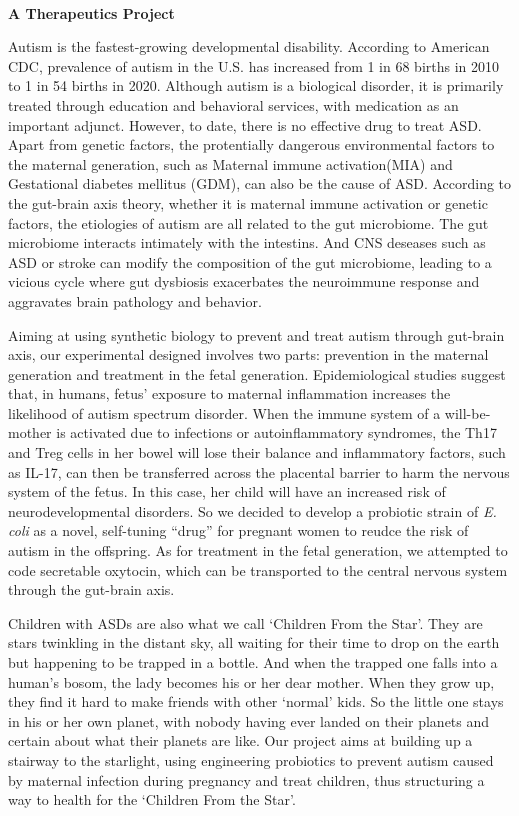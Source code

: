 \textbf{\\A Therapeutics Project\\}\begin{spacing}{1.5}

Autism is the fastest-growing developmental disability. According to American CDC, prevalence of autism in the U.S. has increased from 1 in 68 births in 2010 to 1 in 54 births in 2020. Although autism is a biological disorder, it is primarily treated through education and behavioral services, with medication as an important adjunct. However, to date, there is no effective drug to treat ASD. Apart from genetic factors, the protentially dangerous environmental factors to the maternal generation, such as Maternal immune activation(MIA) and Gestational diabetes mellitus (GDM), can also be the cause of ASD. According to the gut-brain axis theory, whether it is maternal immune activation or genetic factors, the etiologies of autism are all related to the gut microbiome. The gut microbiome interacts intimately with the intestins. And CNS deseases such as ASD or stroke can modify the composition of the gut microbiome, leading to a vicious cycle where gut dysbiosis exacerbates the neuroimmune response and aggravates brain pathology and behavior.

Aiming at using synthetic biology to prevent and treat autism through gut-brain axis, our experimental designed involves two parts: prevention in the maternal generation and treatment in the fetal generation. Epidemiological studies suggest that, in humans, fetus’ exposure to maternal inflammation increases the likelihood of autism spectrum disorder. When the immune system of a will-be-mother is activated due to infections or autoinflammatory syndromes, the Th17 and Treg cells in her bowel will lose their balance and inflammatory factors, such as IL-17, can then be transferred across the placental barrier to harm the nervous system of the fetus. In this case, her child will have an increased risk of neurodevelopmental disorders. So we decided to develop a probiotic strain of \textit{E. coli} as a novel, self-tuning “drug” for pregnant women to reudce the risk of autism in the offspring. As for treatment in the fetal generation, we attempted to code secretable oxytocin, which can be transported to the central nervous system through the gut-brain axis.

Children with ASDs are also what we call ‘Children From the Star’. They are stars twinkling in the distant sky, all waiting for their time to drop on the earth but happening to be trapped in a bottle. And when the trapped one falls into a human’s bosom, the lady becomes his or her dear mother. When they grow up, they find it hard to make friends with other ‘normal’ kids. So the little one stays in his or her own planet, with nobody having ever landed on their planets and certain about what their planets are like. Our project aims at building up a stairway to the starlight, using engineering probiotics to prevent autism caused by maternal infection during pregnancy and treat children, thus structuring a way to health for the ‘Children From the Star’.\end{spacing}
\\

